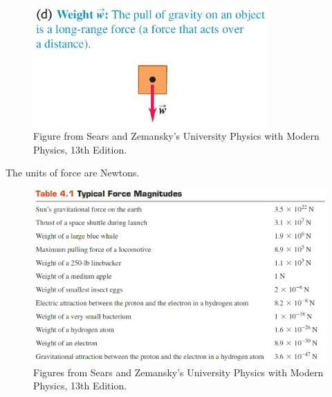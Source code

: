 \documentclass[]{beamer}
\begin{document}
  


    



\begin{frame}

    \begin{figure}[h!]  
        \includegraphics[width=0.8\textwidth]{images/f4.jpg}
        \caption{ {\tiny Figure from Sears and Zemansky's University Physics 
        with Modern Physics, 13th Edition.} }
      \end{figure}
    
    \end{frame}







\begin{frame}

The units of force are Newtons.    
 

\begin{figure}[h!]  
  \includegraphics[width=1.\textwidth]{images/f5.jpg}
  \caption{ {\tiny Figures from Sears and Zemansky's University Physics 
  with Modern Physics, 13th Edition.} }
\end{figure}


    
    \end{frame}
\end{document}
